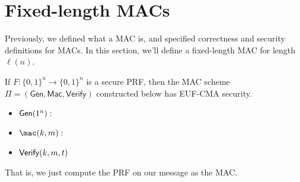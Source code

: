 \newcommand{\nonnegl}{\mathsf{nonnegl}}


\section{Fixed-length MACs}

Previously, we defined what a MAC is, and specified correctness and security definitions for MACs. In this section, we'll define a fixed-length MAC for length $\ell(n)$.

\begin{theorem}
    If $F : \{0, 1\}^n \to \{0, 1\}^n$ is a secure PRF, then the MAC scheme $\Pi = (\mathsf{Gen}, \mathsf{Mac}, \mathsf{Verify})$ constructed below has EUF-CMA security.

    \begin{itemize}
        \item $\mathsf{Gen}(1^n):$
        \item $\mac(k,m):$
        \item $\mathsf{Verify}(k, m, t)$
    \end{itemize}
    That is, we just compute the PRF on our message as the MAC.
\end{theorem}

